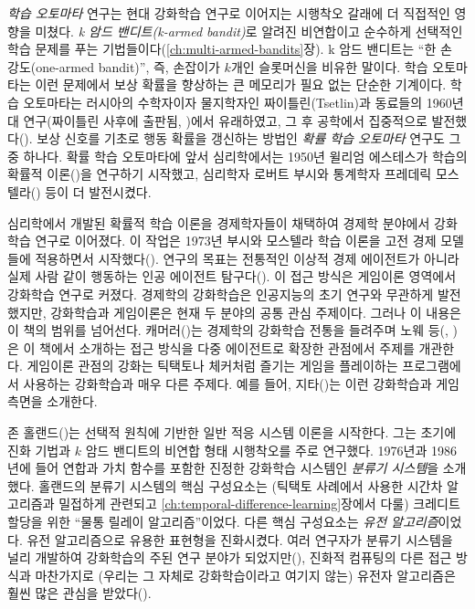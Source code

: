 
\emph{학습 오토마타} 연구는 현대 강화학습 연구로 이어지는 시행착오 갈래에 더
직접적인 영향을 미쳤다. \emph{k 암드 밴디트(k-armed bandit)}로 알려진 비연합이고
순수하게 선택적인 학습 문제를 푸는 기법들이다(\ref{ch:multi-armed-bandits}장).
k 암드 밴디트는 ``한 손 강도(one-armed bandit)'', 즉, 손잡이가 $k$개인
슬롯머신을 비유한 말이다. 학습 오토마타는 이런 문제에서 보상 확률을 향상하는 큰
메모리가 필요 없는 단순한 기계이다. 학습 오토마타는 러시아의 수학자이자
물지학자인 짜이틀린(Tsetlin)과 동료들의 1960년대 연구(짜이틀린 사후에 출판됨,
\cite*{Tsetlin1973})에서 유래하였고, 그 후 공학에서 집중적으로
발전했다(\cite[참고]{NarendraThathachar1974, NarendraThathachar1989}). 보상
신호를 기초로 행동 확률을 갱신하는 방법인 \emph{확률 학습 오토마타} 연구도 그중
하나다. 확률 학습 오토마타에 앞서 심리학에서는 1950년 윌리엄 에스테스가 학습의
확률적 이론(\cite{Estes1950})을 연구하기 시작했고, 심리학자 로버트 부시와
통계학자 프레데릭 모스텔라(\cite{BushMosteller1955}) 등이 더 발전시켰다.

심리학에서 개발된 확률적 학습 이론을 경제학자들이 채택하여 경제학 분야에서
강화학습 연구로 이어졌다. 이 작업은 1973년 부시와 모스텔라 학습 이론을 고전 경제
모델들에 적용하면서 시작했다(\cite{Cross1973}). 연구의 목표는 전통적인 이상적
경제 에이전트가 아니라 실제 사람 같이 행동하는 인공 에이전트
탐구다(\cite{Arthur1991}). 이 접근 방식은 게임이론 영역에서 강화학습 연구로
커졌다. 경제학의 강화학습은 인공지능의 초기 연구와 무관하게 발전했지만,
강화학습과 게임이론은 현재 두 분야의 공통 관심 주제이다. 그러나 이 내용은 이
책의 범위를 넘어선다. 캐머러(\cite{Camerer2003})는 경제학의 강화학습 전통을
들려주며 노웨 등(\citeauthor*{NoweVrancxHauwere2012},
\cite*{NoweVrancxHauwere2012})은 이 책에서 소개하는 접근 방식을 다중 에이전트로
확장한 관점에서 주제를 개관한다. 게임이론 관점의 강화는 틱택토나 체커처럼 즐기는
게임을 플레이하는 프로그램에서 사용하는 강화학습과 매우 다른 주제다. 예를 들어,
지타(\cite{Szita2012})는 이런 강화학습과 게임 측면을 소개한다.

존 홀랜드(\cite{Holland1975})는 선택적 원칙에 기반한 일반 적응 시스템 이론을
시작한다. 그는 초기에 진화 기법과 $k$ 암드 밴디트의 비연합 형태 시행착오를 주로
연구했다. 1976년과 1986년에 들어 연합과 가치 함수를 포함한 진정한 강화학습
시스템인 \emph{분류기 시스템}을 소개했다. 홀랜드의 분류기 시스템의 핵심
구성요소는 (틱택토 사례에서 사용한 시간차 알고리즘과 밀접하게 관련되고
\ref{ch:temporal-difference-learning}장에서 다룰) 크레디트 할당을 위한 ``물통
릴레이 알고리즘''이었다. 다른 핵심 구성요소는
\emph{유전 알고리즘}이었다. 유전 알고리즘으로 유용한 표현형을
진화시켰다. 여러 연구자가 분류기 시스템을 널리 개발하여 강화학습의 주된 연구
분야가 되었지만(\cite{UrbanowiczMoore2009}), 진화적 컴퓨팅의 다른 접근 방식과
마찬가지로 (우리는 그 자체로 강화학습이라고 여기지 않는) 유전자 알고리즘은 훨씬
많은 관심을 받았다(\cite[예,][]{FogelOwensWalsh1966, Koza1992}).

